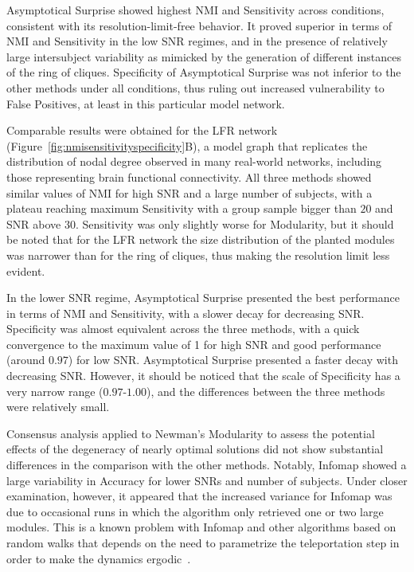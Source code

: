 Asymptotical Surprise showed highest NMI and Sensitivity across conditions, consistent with its resolution-limit-free behavior.
It proved superior in terms of NMI and Sensitivity in the low SNR regimes, and in the presence of relatively large intersubject variability as mimicked by the generation of different instances of the ring of cliques.
Specificity of Asymptotical Surprise was not inferior to the other methods under all conditions, thus ruling out increased vulnerability to False Positives, at least in this particular model network.

Comparable results were obtained for the LFR network (Figure~\ref{fig:nmisensitivityspecificity}B), a model graph that replicates the distribution of nodal degree observed in many real-world networks, including those representing brain functional connectivity.
All three methods showed similar values of NMI for high SNR and a large number of subjects, with a plateau reaching maximum Sensitivity with a group sample bigger than $20$ and SNR above $30$.
Sensitivity was only slightly worse for Modularity, but it should be noted that for the LFR network the size distribution of the planted modules was narrower than for the ring of cliques, thus making the resolution limit less evident.

In the lower SNR regime, Asymptotical Surprise presented the best performance in terms of NMI and Sensitivity, with a slower decay for decreasing SNR. 
Specificity was almost equivalent across the three methods, with a quick convergence to the maximum value of 1 for high SNR and good performance (around $0.97$) for low SNR.
Asymptotical Surprise presented a faster decay with decreasing SNR.
However, it should be noticed that the scale of Specificity has a very narrow range ($0.97$-$1.00$), and the differences between the three methods were relatively small.

Consensus analysis applied to Newman's Modularity to assess the potential effects of the degeneracy of nearly optimal solutions did not show substantial differences in the comparison with the other methods.
Notably, Infomap showed a large variability in Accuracy for lower SNRs and number of subjects.
Under closer examination, however, it appeared that the increased variance for Infomap was due to occasional runs in which the algorithm only retrieved one or two large modules.
This is a known problem with Infomap and other algorithms based on random walks that depends on the need to parametrize the teleportation step in order to make the dynamics ergodic~\cite{lambiotte2012}.

